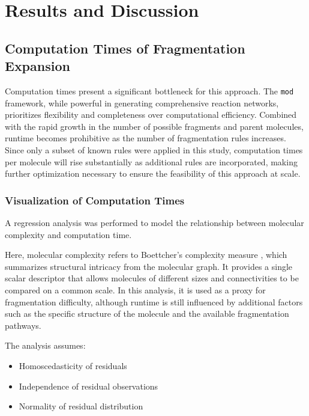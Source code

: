 \chapter{Results and Discussion}
\label{ch:4}
\noindent

\section{Computation Times of Fragmentation Expansion}

Computation times present a significant bottleneck for this approach. 
The \texttt{mod} framework, while powerful in generating comprehensive reaction networks, prioritizes flexibility and completeness over computational efficiency. 
Combined with the rapid growth in the number of possible fragments and parent molecules, runtime becomes prohibitive as the number of fragmentation rules increases.
Since only a subset of known rules were applied in this study, computation times per molecule will rise substantially as additional rules are incorporated, making further optimization necessary to ensure the feasibility of this approach at scale.

\subsection{Visualization of Computation Times}

A regression analysis was performed to model the relationship between molecular complexity and computation time. 

Here, molecular complexity refers to Boettcher's complexity measure \cite{Boettcher2016}, which summarizes structural intricacy from the molecular graph. It provides a single scalar descriptor that allows molecules of different sizes and connectivities to be compared on a common scale. In this analysis, it is used as a
proxy for fragmentation difficulty, although runtime is still influenced by additional factors such as the specific structure of the molecule and the available fragmentation pathways.

The analysis assumes:
\begin{itemize}[noitemsep,topsep=0pt]
    \item Homoscedasticity of residuals
    \item Independence of residual observations
    \item Normality of residual distribution
\end{itemize}

